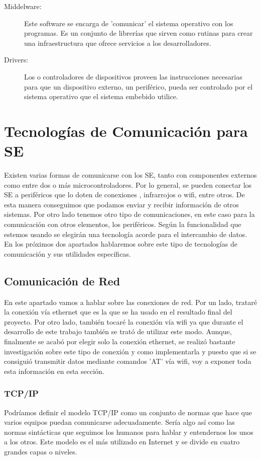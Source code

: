 \begin{description}
\begin{description}
\end{description}
\item[Middelware:] Este software se encarga de 'comunicar' el sistema operativo con los programas. Es un conjunto de librerías que sirven como rutinas para crear una infraestructura que ofrece servicios a los desarrolladores.
\item[Drivers:] Los  o controladores de dispositivos proveen las instrucciones necesarias para que un dispositivo externo, un periférico, pueda ser controlado por el sistema operativo que el sistema embebido utilice.
\end{description}


\section{Tecnologías de Comunicación para SE}\label{sec:Comunicaciones}

Existen varias formas de comunicarse con los SE, tanto con componentes externos como entre dos o más microcontroladores. Por lo general, se pueden conectar los SE a periféricos que lo doten de conexiones , infrarrojos o wifi, entre otros. De esta manera conseguimos que podamos enviar y recibir información de otros sistemas. Por otro lado tenemos otro tipo de comunicaciones, en este caso para la comunicación con otros elementos, los periféricos. Según la funcionalidad que estemos usando se elegirán una tecnología acorde para el intercambio de datos. En los próximos dos apartados hablaremos sobre este tipo de tecnologías de comunicación y sus utilidades específicas. 

\subsection{Comunicación de Red}
En este apartado vamos a hablar sobre las conexiones de red. Por un lado, trataré la conexión vía ethernet que es la que se ha usado en el resultado final del proyecto. Por otro lado, también tocaré la conexión vía wifi ya que durante el desarrollo de este trabajo también se trató de utilizar este modo. Aunque, finalmente se acabó por elegir solo la conexión ethernet, se realizó bastante investigación sobre este tipo de conexión y como implementarla y puesto que si se consiguió transmitir datos mediante comandos 'AT' vía wifi, voy a exponer toda esta información en esta sección.

\subsubsection{TCP/IP}
Podríamos definir el modelo TCP/IP como un conjunto de normas que hace que varios equipos puedan comunicarse adecuadamente. Sería algo así como las normas sintácticas que seguimos los humanos para hablar y entendernos los unos a los otros. Este modelo es el más utilizado en Internet y se divide en cuatro grandes capas o niveles.

